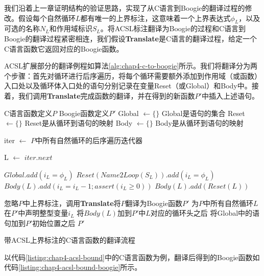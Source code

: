 我们沿着上一章证明结构的验证思路，实现了从C语言到Boogie的翻译过程的修改。假设每个自然循环$L$都有唯一的上界标注，这意味着一个上界表达式$\phi_L$，以及可选的名称$N_L$和作用域标识$S_L$。将ACSL标注翻译为Boogie的过程和C语言到Boogie的翻译过程紧密相连，我们假设\textbf{Translate}是C语言的翻译过程，给定一个C语言函数它返回对应的Boogie函数。

ACSL扩展部分的翻译例程如算法\ref{alg:chap4-c-to-boogie}所示。我们将翻译分为两个步骤：首先对循环进行后序遍历，将每个循环需要额外添加到作用域（或函数）入口处以及循环体入口处的语句分别记录在变量Reset（或Global）和Body中。接着，我们调用\textbf{Translate}完成函数的翻译，并在得到的新函数$P'$中插入上述语句。

\begin{algorithm}
    \begin{algorithmic}
        \REQUIRE C语言函数定义$P$
        \ENSURE Boogie函数定义$P'$
        \STATE Global $\leftarrow \{\}$ \COMMENT Global是语句的集合
        \STATE Reset $\leftarrow \{\}$ \COMMENT Reset是从循环到语句的映射
        \STATE Body $\leftarrow \{\}$ \COMMENT Body是从循环到语句的映射
        
        \STATE iter $\leftarrow$ $P$中所有自然循环的后序遍历迭代器
        
            \STATE L $\leftarrow$ $iter.next$
            
                \STATE $Global.add(i_L = \phi_L)$
            \ELSE
                \STATE $Reset(Name2Loop(S_L)).add(i_L = \phi_L)$
            \ENDIF
            \STATE $Body(L).add(i_L = i_L - 1; assert(i_L \geq 0))$
            \STATE $Body(L).add(Reset(L))$
        \ENDWHILE
        
        \STATE 忽略$P$中上界标注，调用\textbf{Translate}将$P$翻译为Boogie函数$P'$
        \STATE 为$P$中所有自然循环$L$在$P'$中声明整型变量$i_L$
            \STATE 将$Body(L)$加到$P'$中$L$对应的循环头之后
        \ENDFOR
        \STATE 将Global中的语句加到$P'$初始位置之后
        \RETURN $P'$
    \end{algorithmic}
    \caption{带ACSL上界标注的C语言函数的翻译流程}
    \label{alg:chap4-c-to-boogie}
\end{algorithm}
        
以代码\ref{listing:chap4-acsl-bound}中的C语言函数为例，翻译后得到的Boogie函数如代码\ref{listing:chap4-acsl-bound-boogie}所示。

